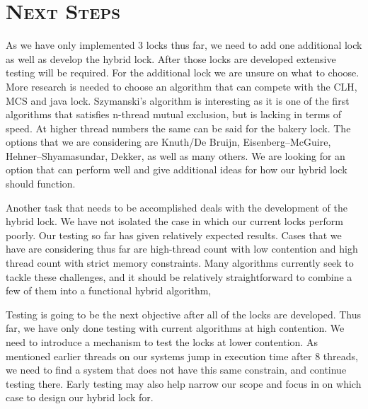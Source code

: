 \documentclass[CheckpointReport.tex]{subfiles}
\begin{document}
\bigskip

\section*{\textsc{\Large Next Steps}}

As we have only implemented 3 locks thus far, we need to add one additional lock as well as develop the hybrid lock. After those locks are developed extensive testing will be required.
For the additional lock we are unsure on what to choose. More research is needed to choose an algorithm that can compete with the CLH, MCS and java lock. Szymanski's algorithm is interesting
 as it is one of the first algorithms that satisfies n-thread mutual exclusion, but is lacking in terms of speed. At higher thread numbers the same can be said for the bakery lock.
The options that we are considering are Knuth/De Bruijn, Eisenberg–McGuire, Hehner–Shyamasundar, Dekker, as well as many others. We are looking for an option that can perform well and give additional ideas for how our hybrid lock should function.

Another task that needs to be accomplished deals with the development of the hybrid lock. We have not isolated the case in which our current locks perform poorly. Our testing so far has given relatively expected results. Cases that we have are considering thus far are high-thread count with low contention and high thread count with strict memory constraints. Many algorithms currently seek to tackle these challenges, and it should be relatively straightforward to combine a few of them into a functional hybrid algorithm,

Testing is going to be the next objective after all of the locks are developed. Thus far, we have only done testing with current algorithms at high contention. We need to introduce a mechanism to test the locks at lower contention. As mentioned earlier threads on our systems jump in execution time after 8 threads, we need to find a system that does not have this same constrain, and continue testing there. Early testing may also help narrow our scope and focus in on which case to design our hybrid lock for.  
\end{document}
